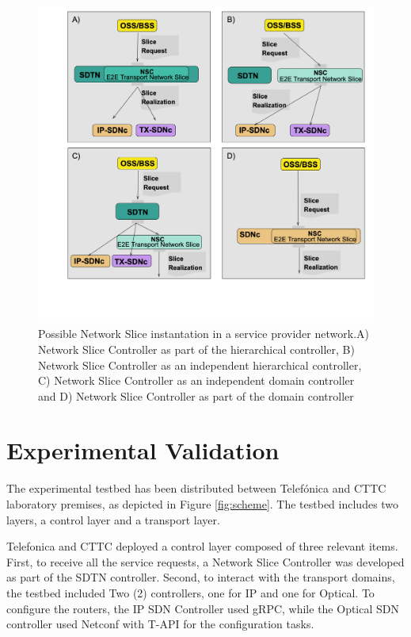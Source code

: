 \documentclass[journal,article,submit,moreauthors,pdftex]{Definitions/mdpi}
\begin{document}
\begin{figure}[htb]%
\includegraphics[width=\linewidth]{Figs/diagram-2.png}
\caption{Possible Network Slice instantation in a service provider network.A) Network Slice Controller as part of the hierarchical controller, B) Network Slice Controller as an independent hierarchical controller, C) Network Slice Controller as an independent domain controller and D) Network Slice Controller as part of the domain controller}
\label{fig:instantiation}
\end{figure}

\section{Experimental Validation}
\label{sec:results}

The experimental testbed has been distributed between Telefónica and CTTC laboratory premises, as depicted in Figure \ref{fig:scheme}. The testbed includes two layers, a control layer and a transport layer.  

Telefonica and CTTC deployed a control layer composed of three relevant items. First, to receive all the service requests, a Network Slice Controller was developed as part of the SDTN controller. Second, to interact with the transport domains, the testbed included Two (2) controllers, one for IP and one for Optical. To configure the routers, the IP SDN Controller used gRPC, while the Optical SDN controller used Netconf with T-API for the configuration tasks.
\end{document}
